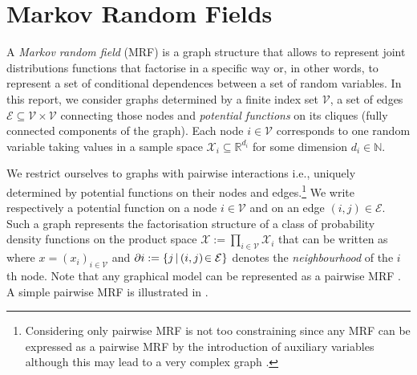 \section{\label{subsection: mrf}Markov Random Fields}
A \emph{Markov random field} (MRF) is a graph structure that allows to represent joint distributions functions that factorise in a specific way or, in other words, to represent a set of conditional dependences between a set of random variables. In this report, we consider graphs determined by a finite index set $\mathcal V$, a set of edges $\mathcal E\subseteq \mathcal V\times \mathcal V$ connecting those nodes and \emph{potential functions} on its cliques (fully connected components of the graph). Each node $i\in\mathcal V$ corresponds to one random variable taking values in a sample space $\mathcal X_i \subseteq\mathbb R^{d_i}$ for some dimension $d_i\in\mathbb N$. 

We restrict ourselves to graphs with pairwise interactions i.e., uniquely determined by potential functions on their nodes and edges.\footnote{Considering only pairwise MRF is not too constraining since any MRF can be expressed as a pairwise MRF by the introduction of auxiliary variables although this may lead to a very complex graph \citet{wainwright08}.}
We write
%
% 
respectively a potential function on a node $i\in \mathcal V$ and on an edge $(i,j)\in \mathcal E$. 
Such a graph represents the factorisation structure of a class of probability density functions on the product space $\mathcal X := \prod_{i\in \mathcal V}\mathcal X_{i}$ that can be written as
where $x=(x_{i})_{i\in \mathcal V}$ and $\partial i:=\{j\,|\, (i,j)\!\in\,\!\mathcal E\}$ denotes the \emph{neighbourhood} of the $i$th node. Note that any graphical model can be represented as a pairwise MRF \citep{yedidia00}. 
A simple pairwise MRF is illustrated in .\\

